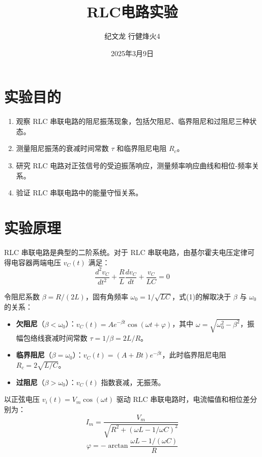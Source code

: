 \documentclass[UTF8]{article}
\title{RLC电路实验}
\author{纪文龙 \quad 行健烽火4 \quad 2024012842}
\date{2025年3月9日}
\begin{document}
\maketitle

\section{实验目的}
\begin{enumerate}
    \item 观察 RLC 串联电路的阻尼振荡现象，包括欠阻尼、临界阻尼和过阻尼三种状态。
    \item 测量阻尼振荡的衰减时间常数 $\tau$ 和临界阻尼电阻 $R_c$。
    \item 研究 RLC 电路对正弦信号的受迫振荡响应，测量频率响应曲线和相位-频率关系。
    \item 验证 RLC 串联电路中的能量守恒关系。
\end{enumerate}

\section{实验原理}

RLC 串联电路是典型的二阶系统。对于 RLC 串联电路，由基尔霍夫电压定律可得电容器两端电压 $v_C(t)$ 满足：
\begin{equation}
\frac{d^2 v_C}{dt^2} + \frac{R}{L} \frac{dv_C}{dt} + \frac{v_C}{LC} = 0
\end{equation}

令阻尼系数 $\beta = R/(2L)$，固有角频率 $\omega_0 = 1/\sqrt{LC}$，式(1)的解取决于 $\beta$ 与 $\omega_0$ 的关系：
\begin{itemize}
    \item \textbf{欠阻尼}（$\beta < \omega_0$）：$v_C(t) = A e^{-\beta t} \cos(\omega t + \varphi)$，其中 $\omega = \sqrt{\omega_0^2 - \beta^2}$，振幅包络线衰减时间常数 $\tau = 1/\beta = 2L/R$。
    \item \textbf{临界阻尼}（$\beta = \omega_0$）：$v_C(t) = (A + Bt)e^{-\beta t}$，此时临界阻尼电阻 $R_c = 2\sqrt{L/C}$。
    \item \textbf{过阻尼}（$\beta > \omega_0$）：$v_C(t)$ 指数衰减，无振荡。
\end{itemize}

以正弦电压 $v_i(t) = V_m \cos(\omega t)$ 驱动 RLC 串联电路时，电流幅值和相位差分别为：
\begin{equation}
I_m = \frac{V_m}{\sqrt{R^2 + (\omega L - 1/\omega C)^2}}
\end{equation}
\begin{equation}
\varphi = -\arctan\frac{\omega L - 1/(\omega C)}{R}
\end{equation}
\end{document}

